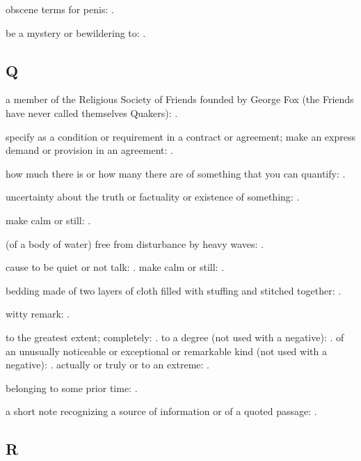   obscene terms for penis: .

  be a mystery or bewildering to: .

\subsection*{Q}

  a member of the Religious Society of Friends founded by George Fox (the Friends have never called themselves Quakers): .

  specify as a condition or requirement in a contract or agreement; make an express demand or provision in an agreement: .

  how much there is or how many there are of something that you can quantify: .

  uncertainty about the truth or factuality or existence of something: .

  make calm or still: .

  (of a body of water) free from disturbance by heavy waves: .

  cause to be quiet or not talk: . make calm or still: .

  bedding made of two layers of cloth filled with stuffing and stitched together: .

  witty remark: .

  to the greatest extent; completely: . to a degree (not used with a negative): . of an unusually noticeable or exceptional or remarkable kind (not used with a negative): . actually or truly or to an extreme: .

  belonging to some prior time: .

  a short note recognizing a source of information or of a quoted passage: .

\subsection*{R}

